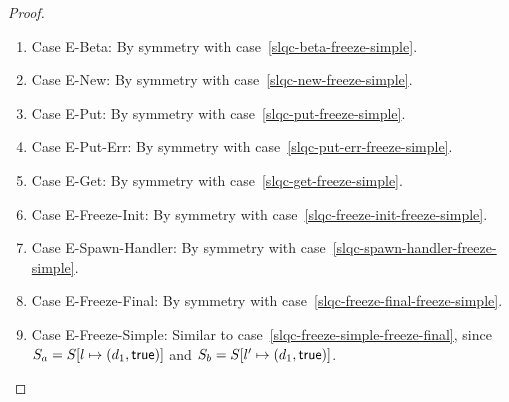 \begin{proof}
\begin{enumerate}
    \begin{enumerate}
    \item \label{slqc-freeze-simple-beta}Case {\sc E-Beta}: By symmetry with case~\ref{slqc-beta-freeze-simple}.
    \item \label{slqc-freeze-simple-new}Case {\sc E-New}: By symmetry with case~\ref{slqc-new-freeze-simple}.
    \item \label{slqc-freeze-simple-put}Case {\sc E-Put}: By symmetry with case~\ref{slqc-put-freeze-simple}.
    \item \label{slqc-freeze-simple-put-err}Case {\sc E-Put-Err}: By symmetry with case~\ref{slqc-put-err-freeze-simple}.
    \item \label{slqc-freeze-simple-get}Case {\sc E-Get}: By symmetry with case~\ref{slqc-get-freeze-simple}.
    \item \label{slqc-freeze-simple-freeze-init}Case {\sc E-Freeze-Init}: By symmetry with case~\ref{slqc-freeze-init-freeze-simple}.
    \item \label{slqc-freeze-simple-spawn-handler}Case {\sc E-Spawn-Handler}: By symmetry with case~\ref{slqc-spawn-handler-freeze-simple}.
    \item \label{slqc-freeze-simple-freeze-final}Case {\sc E-Freeze-Final}: By symmetry with case~\ref{slqc-freeze-final-freeze-simple}.
    \item \label{slqc-freeze-simple-freeze-simple}Case {\sc
      E-Freeze-Simple}: Similar to
      case~\ref{slqc-freeze-simple-freeze-final}, since $S_a =
      S[l \mapsto (d_1, \textsf{true})]$ and $S_b =
      S[l' \mapsto (d_1, \textsf{true})]$.
    \end{enumerate}

  \end{enumerate}
\end{proof}

